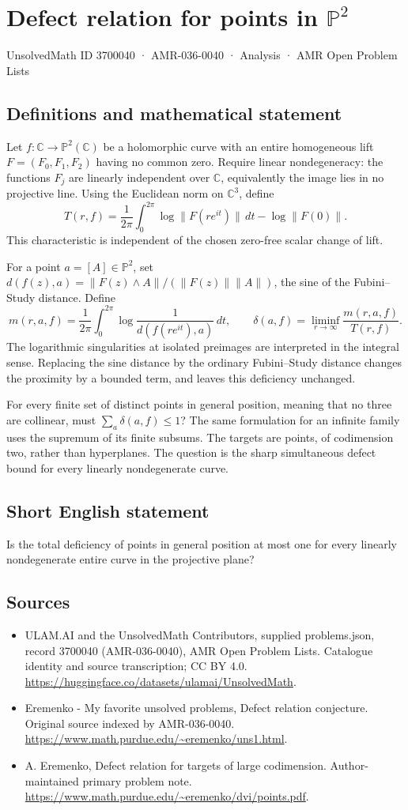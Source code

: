\documentclass[11pt,a4paper]{article}
\begin{document}
\section*{Defect relation for points in $\mathbb P^2$}\label{3700040}
{\small UnsolvedMath ID 3700040 · AMR-036-0040 · Analysis · AMR Open Problem Lists}
\subsection{Definitions and mathematical statement}
Let $f:\mathbb C\to\mathbb P^2(\mathbb C)$ be
a holomorphic curve with an entire homogeneous lift
$F=(F_0,F_1,F_2)$ having no common zero.
Require linear nondegeneracy: the functions $F_j$
are linearly independent over $\mathbb C$, equivalently
the image lies in no projective line.
Using the Euclidean norm on $\mathbb C^3$, define
\[
 T(r,f)=\frac1{2\pi}\int_0^{2\pi}
               \log\|F(re^{it})\|\,dt-\log\|F(0)\|.
\]
This characteristic is independent of the chosen
zero-free scalar change of lift.

For a point $a=[A]\in\mathbb P^2$, set
$d(f(z),a)=\|F(z)\wedge A\|/(\|F(z)\|\|A\|)$,
the sine of the Fubini--Study distance. Define
\[
 m(r,a,f)=\frac1{2\pi}\int_0^{2\pi}
                    \log\frac1{d(f(re^{it}),a)}\,dt,
 \qquad
 \delta(a,f)=\liminf_{r\to\infty}\frac{m(r,a,f)}{T(r,f)}.
\]
The logarithmic singularities at isolated preimages
are interpreted in the integral sense. Replacing
the sine distance by the ordinary Fubini--Study
distance changes the proximity by a bounded term,
and leaves this deficiency unchanged.

For every finite set of distinct points in
general position, meaning that no three are
collinear, must
$\sum_a\delta(a,f)\leq1$?
The same formulation for an infinite family uses
the supremum of its finite subsums. The targets
are points, of codimension two, rather than
hyperplanes. The question is the sharp simultaneous
defect bound for every linearly nondegenerate curve.
\subsection{Short English statement}
Is the total deficiency of points in general position at most one for every linearly nondegenerate entire curve in the projective plane?
\subsection{Sources}
\begin{itemize}
\item[S1] ULAM.AI and the UnsolvedMath Contributors, supplied problems.json, record 3700040 (AMR-036-0040), AMR Open Problem Lists. Catalogue identity and source transcription; CC BY 4.0.
\url{https://huggingface.co/datasets/ulamai/UnsolvedMath}.
\item[S2] Eremenko - My favorite unsolved problems, Defect relation conjecture. Original source indexed by AMR-036-0040.
\url{https://www.math.purdue.edu/~eremenko/uns1.html}.
\item[S3] A. Eremenko, Defect relation for targets of large codimension. Author-maintained primary problem note.
\url{https://www.math.purdue.edu/~eremenko/dvi/points.pdf}.
\end{itemize}
\end{document}
